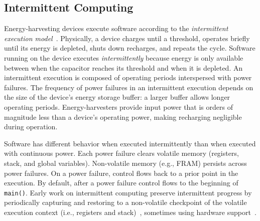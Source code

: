 \subsection{Intermittent Computing}
\label{sec:background_consistency}
Energy-harvesting devices execute software according to the {\em intermittent
execution model}~\cite{dino,chain,alpaca,ratchet}.  Physically, a device
charges until a threshold, operates briefly until its energy is depleted, shuts
down recharges, and repeats the cycle.  Software running on the device executes
{\em intermittently} because energy is only available between when the
capacitor reaches its threshold and when it is depleted. An intermittent
execution is composed of operating periods interspersed with power failures.
The frequency of power failures in an intermittent execution depends on the
size of the device's energy storage buffer: a larger buffer allows longer
operating periods.  Energy-harvesters provide input power that is orders of
magnitude less than a device's operating power, making recharging negligible
during operation.

Software has different behavior when executed intermittently than when executed
with continuous power.  Each power failure clears volatile memory (registers,
stack, and global variables). Non-volatile memory (e.g., FRAM) persists across
power failures. On a power failure, control flows back to a prior point in the
execution. By default, after a power failure control flows to the beginning of
{\tt main()}. Early work on intermittent computing preserve intermittent
progress by periodically capturing and restoring to a non-volatile checkpoint
of the volatile execution context (i.e., registers and
stack)~\cite{mementos,quickrecall}, sometimes using
hardware support~\cite{mementos,mottola2017harvos,hibernusplusplus,hibernus,idetic}. 

